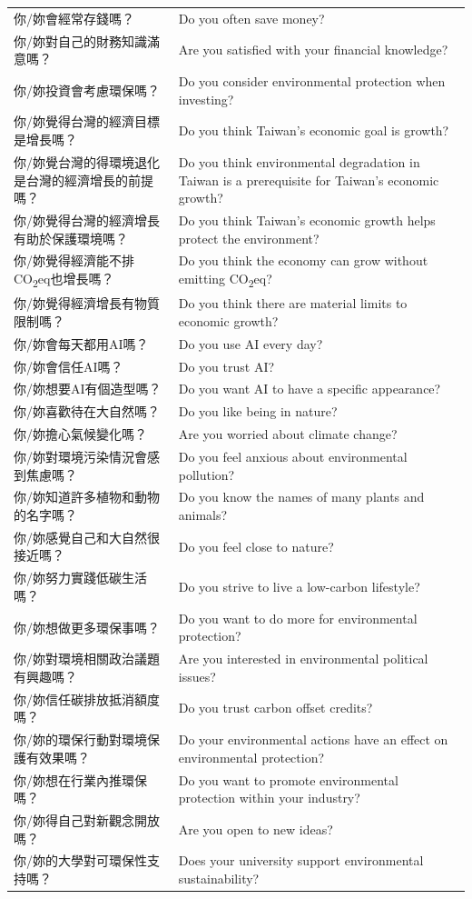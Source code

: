 \documentclass[
  12pt,
  letterpaper,
  DIV=11,
  numbers=noendperiod]{scrartcl}
\begin{document}
\begin{longtable}[]{@{}
  >{\raggedright\arraybackslash}p{}
  >{\raggedright\arraybackslash}p{}@{}}
你/妳會經常存錢嗎？ & Do you often save money? \\
你/妳對自己的財務知識滿意嗎？ & Are you satisfied with your financial
knowledge? \\
你/妳投資會考慮環保嗎？ & Do you consider environmental protection when
investing? \\
你/妳覺得台灣的經濟目標是增長嗎？ & Do you think Taiwan's economic goal
is growth? \\
你/妳覺台灣的得環境退化是台灣的經濟增長的前提嗎？ & Do you think
environmental degradation in Taiwan is a prerequisite for Taiwan's
economic growth? \\
你/妳覺得台灣的經濟增長有助於保護環境嗎？ & Do you think Taiwan's
economic growth helps protect the environment? \\
你/妳覺得經濟能不排CO\textsubscript{2}eq也增長嗎？ & Do you think the
economy can grow without emitting CO\textsubscript{2}eq? \\
你/妳覺得經濟增長有物質限制嗎？ & Do you think there are material limits
to economic growth? \\
你/妳會每天都用AI嗎？ & Do you use AI every day? \\
你/妳會信任AI嗎？ & Do you trust AI? \\
你/妳想要AI有個造型嗎？ & Do you want AI to have a specific
appearance? \\
你/妳喜歡待在大自然嗎？ & Do you like being in nature? \\
你/妳擔心氣候變化嗎？ & Are you worried about climate change? \\
你/妳對環境污染情況會感到焦慮嗎？ & Do you feel anxious about
environmental pollution? \\
你/妳知道許多植物和動物的名字嗎？ & Do you know the names of many plants
and animals? \\
你/妳感覺自己和大自然很接近嗎？ & Do you feel close to nature? \\
你/妳努力實踐低碳生活嗎？ & Do you strive to live a low-carbon
lifestyle? \\
你/妳想做更多環保事嗎？ & Do you want to do more for environmental
protection? \\
你/妳對環境相關政治議題有興趣嗎？ & Are you interested in environmental
political issues? \\
你/妳信任碳排放抵消額度嗎？ & Do you trust carbon offset credits? \\
你/妳的環保行動對環境保護有效果嗎？ & Do your environmental actions have
an effect on environmental protection? \\
你/妳想在行業內推環保嗎？ & Do you want to promote environmental
protection within your industry? \\
你/妳得自己對新觀念開放嗎？ & Are you open to new ideas? \\
你/妳的大學對可環保性支持嗎？ & Does your university support
environmental sustainability? \\
\end{longtable}
\end{document}
